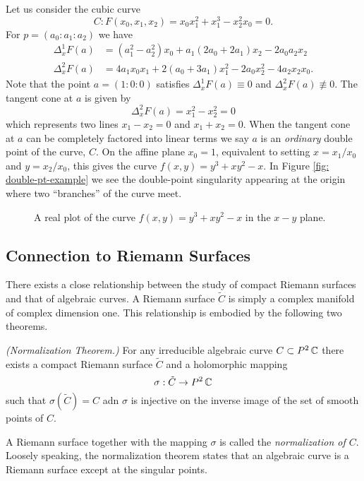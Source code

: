 \begin{example}
Let us consider the cubic curve
\[
    C: F(x_0,x_1,x_2) = x_0x_1^2 + x_1^3 - x_2^2x_0 = 0.
\]
For $p = (a_0 : a_1 : a_2)$ we have
\begin{align*}
    \Delta_x^1 F(a) &=
        (a_1^2 - a_2^2)x_0 + a_1(2a_0 + 2a_1)x_2 - 2a_0a_2x_2 \\
    \Delta_x^2 F(a) &=
        4a_1x_0x_1 + 2(a_0+3a_1)x_1^2 - 2a_0x_2^2 - 4a_2x_2x_0.
\end{align*}
Note that the point $a = (1 : 0 : 0)$ satisfies $\Delta_x^1 F(a) \equiv
0$ and $\Delta_x^2 F(a) \not \equiv 0$. The tangent cone at $a$ is given
by
\[
    \Delta_x^2 F(a) = x_1^2 - x_2^2 = 0
\]
which represents two lines $x_1 - x_2 = 0$ and $x_1 + x_2 = 0$. When the
tangent cone at $a$ can be completely factored into linear terms we say
$a$ is an {\it ordinary} double point of the curve, $C$. On the affine
plane $x_0=1$, equivalent to setting $x = x_1/x_0$ and $y=x_2/x_0$, this
gives the curve $f(x,y) = y^3 + xy^2 - x$. In Figure \ref{fig:
  double-pt-example} we see the double-point singularity appearing at
the origin where two ``branches'' of the curve meet.
\end{example}

\begin{figure}
  \label{fig: double-pt-example}
  \caption{A real plot of the curve $f(x,y) = y^3 + xy^2 - x$ in the $x-y$ plane.}
\end{figure}

\subsection{Connection to Riemann Surfaces}

There exists a close relationship between the study of compact Riemann
surfaces and that of algebraic curves. A Riemann surface $\tilde{C}$ is
simply a complex manifold of complex dimension one. This relationship is
embodied by the following two theorems.

\begin{theorem} \label{thm: normalization}
  {\it (Normalization Theorem.)} For any irreducible algebraic curve $C
  \subset P^2\operatorname{\mathbb{C}}$ there exists a compact Riemann surface $\tilde{C}$ and
  a holomorphic mapping
  \[
    \sigma : \tilde{C} \to P^2\operatorname{\mathbb{C}}
  \]
  such that $\sigma( \tilde{C} ) = C$ adn $\sigma$ is injective on the
  inverse image of the set of smooth points of $C$.
\end{theorem}

A Riemann surface together with the mapping $\sigma$ is called the {\it
  normalization of $C$}. Loosely speaking, the normalization theorem
states that an algebraic curve is a Riemann surface except at the
singular points.

